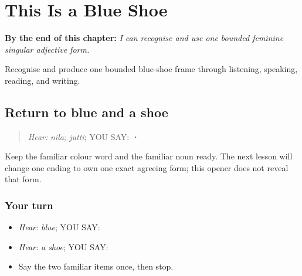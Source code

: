 
\chapter{This Is a Blue Shoe}
\label{ch:pa-a2-nili}

\begin{chapteropening}
\textbf{By the end of this chapter:} \emph{I can recognise and use one bounded feminine singular adjective form.}

Recognise and produce one bounded blue-shoe frame through listening, speaking, reading, and writing.
\end{chapteropening}

\section[\texorpdfstring{\pa{ਨੀਲਾ} · \pa{ਜੁੱਤੀ} (nila; jutti)}{ਨੀਲਾ · ਜੁੱਤੀ (nila; jutti)}]{Return to blue and a shoe}

\label{lesson:PA-C209-nila-return}



\begin{quote}
\emph{Hear:} \emph{nila; jutti}; YOU SAY: \textbf{ · }
\end{quote}

\begin{grammarlens}[title={Grammar Lens}]
Keep the familiar colour word and the familiar noun ready. The next lesson will change one ending to own one exact agreeing form; this opener does not reveal that form.
\end{grammarlens}

\subsection*{Your turn}
\begin{itemize}
\raggedright
  \item \emph{Hear:} \emph{blue}; YOU SAY: \textbf{}
  \item \emph{Hear:} \emph{a shoe}; YOU SAY: \textbf{}
  \item Say the two familiar items once, then stop.
\end{itemize}

